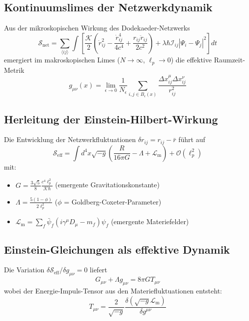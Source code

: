 \subsection{Kontinuumslimes der Netzwerkdynamik}
Aus der mikroskopischen Wirkung des Dodekaeder-Netzwerks
\begin{equation}
\mathcal{S}_{\text{net}} = \sum_{\langle ij \rangle} \int \left[ \frac{\mathcal{K}}{2} \left( \dot{r}_{ij}^2 - \frac{\dot{r}_{ij}^4}{4c^4} + \frac{r_{ij}\ddot{r}_{ij}}{2c^2} \right) + \lambda \hbar \mathcal{I}_{ij} |\Psi_i - \Psi_j|^2 \right] dt
\end{equation}
emergiert im makroskopischen Limes ($N \to \infty$, $\ell_p \to 0$) die effektive Raumzeit-Metrik
\begin{equation}
g_{\mu\nu}(x) = \lim_{\epsilon \to 0} \frac{1}{N_\epsilon} \sum_{i,j \in B_\epsilon(x)} \frac{\Delta x_{ij}^\mu \Delta x_{ij}^\nu}{r_{ij}^2}
\end{equation}

\subsection{Herleitung der Einstein-Hilbert-Wirkung}
Die Entwicklung der Netzwerkfluktuationen $\delta r_{ij} = r_{ij} - \bar{r}$ führt auf
\begin{equation}
\mathcal{S}_{\text{eff}} = \int d^4x \sqrt{-g} \left( \frac{R}{16\pi G} - \Lambda + \mathcal{L}_{\text{m}} \right) + \mathcal{O}(\ell_p^2)
\end{equation}
mit:
\begin{itemize}
\item $G = \frac{3\sqrt{5}}{8} \frac{c^4\ell_p^2}{\mathcal{K}\hbar}$ (emergente Gravitationskonstante)
\item $\Lambda = \frac{5(1-\phi)}{2\ell_p^2}$ ($\phi$ = Goldberg-Coxeter-Parameter)
\item $\mathcal{L}_{\text{m}} = \sum_f \bar{\psi}_f (i\gamma^\mu D_\mu - m_f)\psi_f$ (emergente Materiefelder)
\end{itemize}

\subsection{Einstein-Gleichungen als effektive Dynamik}
Die Variation $\delta\mathcal{S}_{\text{eff}}/\delta g_{\mu\nu} = 0$ liefert
\begin{equation}
G_{\mu\nu} + \Lambda g_{\mu\nu} = 8\pi G T_{\mu\nu}
\end{equation}
wobei der Energie-Impuls-Tensor aus den Materiefluktuationen entsteht:
\begin{equation}
T_{\mu\nu} = \frac{2}{\sqrt{-g}} \frac{\delta (\sqrt{-g}\mathcal{L}_{\text{m}})}{\delta g^{\mu\nu}}
\end{equation}

